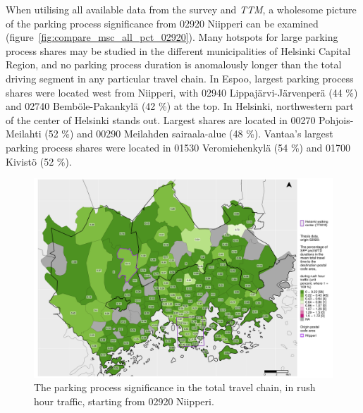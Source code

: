 When utilising all available data from the survey and \textit{TTM}, a wholesome picture of the parking process significance from 02920 Niipperi can be examined (figure~\ref{fig:compare_msc_all_pct_02920}). Many hotspots for large parking process shares may be studied in the different municipalities of Helsinki Capital Region, and no parking process duration is anomalously longer than the total driving segment in any particular travel chain. In Espoo, largest parking process shares were located west from Niipperi, with 02940 Lippajärvi-Järvenperä (44 \%) and 02740 Bemböle-Pakankylä (42 \%) at the top. In Helsinki, northwestern part of the center of Helsinki stands out. Largest shares are located in 00270 Pohjois-Meilahti (52 \%) and 00290 Meilahden sairaala-alue (48 \%). Vantaa's largest parking process shares were located in 01530 Veromiehenkylä (54 \%) and 01700 Kivistö (52 \%). 

\begin{figure}[H]%
    \centering
    \includegraphics[trim={0.9cm 0.3cm 0.25cm 0.3cm},clip,width=\textwidth]{images/compare_traveltimes_mapfill-msc_r_pct_fromzip-02920_28-09-2020.png}
    \caption[Parking process significance from Niipperi, rush hour traffic]{The parking process significance in the total travel chain, in rush hour traffic, starting from 02920 Niipperi.}%
    \label{fig:compare_msc_r_pct_02920}%
\end{figure}

